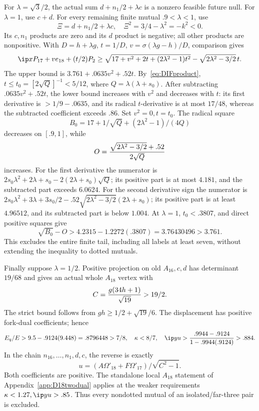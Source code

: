 For \(\lambda=\sqrt3/2\), the actual sum
\(d+n_1/2+\lambda c\) is a nonzero feasible future null.
For \(\lambda=1\), use \(c+d\).
For every remaining finite mutual \(.9<\lambda<1\), use
\[
 \Xi=d+n_1/2+\lambda c,\quad
 \Xi^2=3/4-\lambda^2=-k^2<0 .
\]
Its \(c,n_1\) products are zero and its \(d\) product is negative;
all other products are nonpositive.
With \(D=h+\lambda g\), \(t=1/D\),
\(v=\sigma(\lambda g-h)/D\), comparison gives
\[
 \ip x{P_{17}+ve_{18}+(t/2)P_2}
 \ge\sqrt{17+v^2+2t+(2\lambda^2-1)t^2}
                         -\sqrt{2\lambda^2-3/2}\,t .
\]
The upper bound is
\(3.761+.0635v^2+.52t\).
By~\eqref{eq:DIFproduct},
\(t\le t_0=[2\sqrt{Q}]^{-1}<5/12\), where
\(Q=\lambda(\lambda+s_0)\).
After subtracting \(.0635v^2+.52t\), the lower bound increases
with \(v^2\) and decreases with \(t\):
its first derivative is \(>1/9-.0635\), and its radical
\(t\)-derivative is at most \(17/48\), whereas the subtracted
coefficient exceeds \(.86\).
Set \(v^2=0,t=t_0\).
The radical square
\[
 B_0=17+1/\sqrt Q+(2\lambda^2-1)/(4Q)
\]
decreases on \([.9,1]\), while
\[
 O={\sqrt{2\lambda^2-3/2}+.52\over2\sqrt Q}
\]
increases.
For the first derivative the numerator is
\(2s_0\lambda^2+2\lambda+s_0
 -2(2\lambda+s_0)\sqrt Q\);
its positive part is at most \(4.181\), and the subtracted
part exceeds \(6.0624\).
For the second derivative sign the numerator is
\(2s_0\lambda^2+3\lambda+3s_0/2
 -.52\sqrt{2\lambda^2-3/2}(2\lambda+s_0)\);
its positive part is at least \(4.96512\), and its subtracted
part is below \(1.004\).
At \(\lambda=1\), \(t_0<.3807\), and direct positive squares give
\[
 \sqrt{B_0}-O>
 4.2315-1.2272(.3807)=3.76430496>3.761 .
\]
This excludes the entire finite tail, including all labels at least
seven, without extending the inequality to dotted mutuals.

Finally suppose \(\lambda=1/2\).
Positive projection on old \(A_{16},c,d\) has determinant
\(19/68\) and gives an actual whole \(A_{18}\) vertex with
\[
 C={g(34h+1)\over\sqrt{19}}>19/2 .
\]
The strict bound follows from
\(gh\ge1/2+\sqrt{19}/6\).
The displacement has positive fork-dual coefficients; hence
\[
 E_q/E>9.5-.9124(9.448)=.8796448>7/8,\quad
 \kappa<8/7,\quad
 \ip yu>{.9944-.9124\over1-.9944(.9124)}>.884 .
\]
In the chain \(n_{16},\ldots,n_1,d,c\), the reverse is exactly
\[
             u=(A\Omega'_{18}+F\Omega'_{17})/
                         \sqrt{C^2-1}.
\]
Both coefficients are positive.
The standalone local \(A_{18}\) statement of
Appendix~\ref{app:D18twodual} applies at the weaker requirements
\(\kappa<1.27,\ip yu>.85\).
Thus every nondotted mutual of an isolated/far-three pair is excluded.

